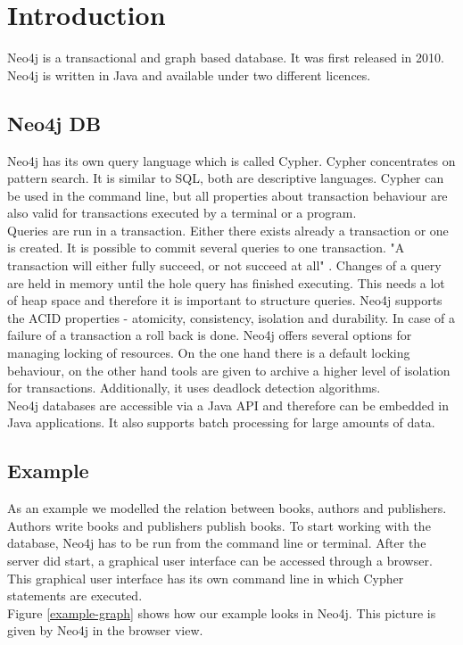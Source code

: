 
\section{Introduction}
Neo4j is a transactional and graph based database. It was first released in 2010. Neo4j is written in Java and available under two different licences. 


\subsection{Neo4j DB}
Neo4j has its own query language which is called Cypher. Cypher concentrates on pattern search. It is similar to SQL, both are descriptive languages. Cypher can be used in the command line, but all properties about transaction behaviour are also valid for transactions executed by a terminal or a program. \nocite{neo4jman:2011}\\
Queries are run in a transaction. Either there exists already a transaction or one is created. It is possible to commit several queries to one transaction. "A transaction will either fully succeed, or not succeed at all" \cite{}. Changes of a query are held in memory until the hole query has finished executing. This needs a lot of heap space and therefore it is important to structure queries. Neo4j supports the ACID properties - atomicity, consistency, isolation and durability. In case of a failure of a transaction a roll back is done. Neo4j offers several options for managing locking of resources. On the one hand there is a default locking behaviour, on the other hand tools are given to archive a higher level of isolation for transactions. Additionally, it uses deadlock detection algorithms.\\
Neo4j databases are accessible via a Java API and therefore can be embedded in Java applications. It also supports batch processing for large amounts of data.

\subsection{Example}
As an example we modelled  the relation between books, authors and publishers. Authors write books and publishers publish books. To start working with the database, Neo4j has to be run from the command line or terminal. After the server did start, a graphical user interface can be accessed through a browser. This graphical user interface has its own command line in which Cypher statements are executed.\\
Figure \ref{example-graph} shows how our example looks in Neo4j. This picture is given by Neo4j in the browser view.

